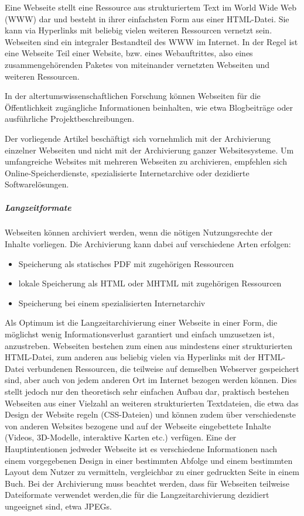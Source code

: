 \hyphenation{
}

Eine Webseite stellt eine Ressource aus strukturiertem Text im World Wide Web (WWW) dar und besteht in ihrer einfachsten Form aus einer HTML-Datei. Sie kann via Hyperlinks mit beliebig vielen weiteren Ressourcen vernetzt sein. Webseiten sind ein integraler Bestandteil des WWW im Internet. In der Regel ist eine Webseite Teil einer Website, bzw. eines Webauftrittes, also eines zusammengehörenden Paketes von miteinander vernetzten Webseiten und weiteren Ressourcen.

In der altertumswissenschaftlichen Forschung können Webseiten für die Öffentlichkeit zugängliche Informationen beinhalten, wie etwa Blogbeiträge oder ausführliche Projektbeschreibungen.

Der vorliegende Artikel beschäftigt sich vornehmlich mit der Archivierung einzelner Webseiten und nicht mit der Archivierung ganzer Websitesysteme. Um umfangreiche Websites mit mehreren Webseiten zu archivieren, empfehlen sich Online-Speicherdienste, spezialisierte Internetarchive oder dezidierte Softwarelösungen. 

\subparagraph{Langzeitformate} 
Webseiten können archiviert werden, wenn die nötigen Nutzungsrechte der Inhalte vorliegen. Die Archivierung kann dabei auf verschiedene Arten erfolgen:
\begin{itemize}
	\item Speicherung als statisches PDF mit zugehörigen Ressourcen
	\item lokale Speicherung als HTML oder MHTML mit zugehörigen Ressourcen
	\item Speicherung bei einem spezialisierten Internetarchiv
\end{itemize}

Als Optimum ist die Langzeitarchivierung einer Webseite in einer Form, die möglichst wenig Informationsverlust garantiert und einfach umzusetzen ist, anzustreben. Webseiten bestehen zum einen aus mindestens einer strukturierten HTML-Datei, zum anderen aus beliebig vielen via Hyperlinks mit der HTML-Datei verbundenen Ressourcen, die teilweise auf demselben Webserver gespeichert sind, aber auch von jedem anderen Ort im Internet bezogen werden können. Dies stellt jedoch nur den theoretisch sehr einfachen Aufbau dar, praktisch bestehen Webseiten aus einer Vielzahl an weiteren strukturierten Textdateien, die etwa das Design der Website regeln (CSS-Dateien) und können zudem über verschiedenste von anderen Websites bezogene und auf der Webseite eingebettete Inhalte (Videos, 3D-Modelle, interaktive Karten etc.) verfügen. Eine der Hauptintentionen jedweder Webseite ist es verschiedene Informationen nach einem vorgegebenen Design in einer bestimmten Abfolge und einem bestimmten Layout dem Nutzer zu vermitteln, vergleichbar zu einer gedruckten Seite in einem Buch. Bei der Archivierung muss beachtet werden, dass für Webseiten teilweise Dateiformate verwendet werden,die für die Langzeitarchivierung dezidiert ungeeignet sind, etwa JPEGs. 


